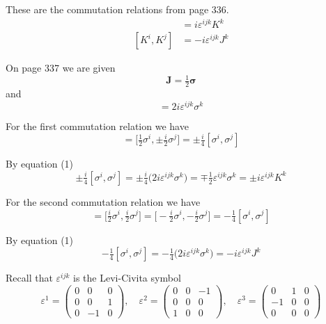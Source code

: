 


\bigskip
These are the commutation relations from page 336.
\begin{align*}
[J^i,K^j]&=i\varepsilon^{ijk}K^k
\\
[K^i,K^j]&=-i\varepsilon^{ijk}J^k
\end{align*}

On page 337 we are given
\begin{equation*}
\mathbf J=\tfrac{1}{2}\boldsymbol\sigma
\end{equation*}
and
\begin{equation*}
[\sigma^i,\sigma^j]=2i\varepsilon^{ijk}\sigma^k
\tag{1}
\end{equation*}

For the first commutation relation we have
\begin{equation*}
[J^i,\pm K^j]
=\big[\tfrac{1}{2}\sigma^i,\pm\tfrac{i}{2}\sigma^j\big]
=\pm\tfrac{i}{4}[\sigma^i,\sigma^j]
\end{equation*}

By equation (1)
\begin{equation*}
\pm\tfrac{i}{4}[\sigma^i,\sigma^j]
=\pm\tfrac{i}{4}\big(2i\varepsilon^{ijk}\sigma^k\big)
=\mp\tfrac{1}{2}\varepsilon^{ijk}\sigma^k
=\pm i\varepsilon^{ijk}K^k
\end{equation*}

For the second commutation relation we have
\begin{equation*}
[K^i,K^j]=\big[\tfrac{i}{2}\sigma^i,\tfrac{i}{2}\sigma^j\big]
=\big[{-}\tfrac{i}{2}\sigma^i,-\tfrac{i}{2}\sigma^j\big]
=-\tfrac{1}{4}[\sigma^i,\sigma^j]
\end{equation*}

By equation (1)
\begin{equation*}
-\tfrac{1}{4}[\sigma^i,\sigma^j]
=-\tfrac{1}{4}\big(2i\varepsilon^{ijk}\sigma^k\big)
=-i\varepsilon^{ijk}J^k
\end{equation*}



Recall that $\varepsilon^{ijk}$ is the Levi-Civita symbol
\begin{equation*}
\varepsilon^1=\begin{pmatrix}
0&0&0
\\
0&0&1
\\
0&-1&0
\end{pmatrix},
\quad
\varepsilon^2=\begin{pmatrix}
0&0&-1
\\
0&0&0
\\
1&0&0
\end{pmatrix},
\quad
\varepsilon^3=\begin{pmatrix}
0&1&0
\\
-1&0&0
\\
0&0&0
\end{pmatrix}
\end{equation*}


